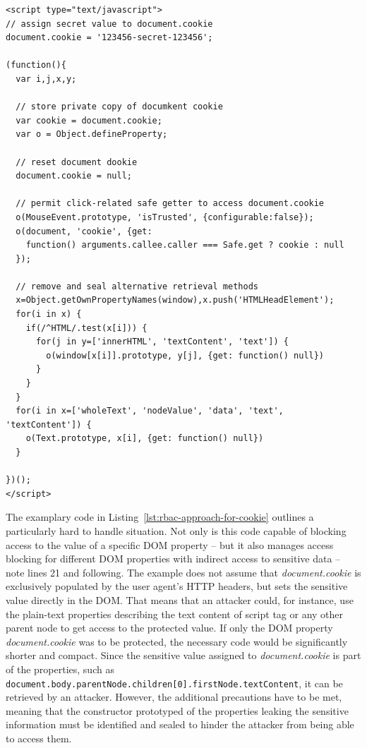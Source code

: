 \begin{lstlisting}[captionpos=b,label=lst:rbac-approach-for-cookie,caption=Proposed DOM-based RBAC approach to handle document.cookie access]
<script type="text/javascript">
// assign secret value to document.cookie
document.cookie = '123456-secret-123456';

(function(){
  var i,j,x,y; 

  // store private copy of documkent cookie
  var cookie = document.cookie; 
  var o = Object.defineProperty;
  
  // reset document dookie
  document.cookie = null;

  // permit click-related safe getter to access document.cookie
  o(MouseEvent.prototype, 'isTrusted', {configurable:false});
  o(document, 'cookie', {get: 
    function() arguments.callee.caller === Safe.get ? cookie : null
  });        

  // remove and seal alternative retrieval methods
  x=Object.getOwnPropertyNames(window),x.push('HTMLHeadElement');
  for(i in x) {
    if(/^HTML/.test(x[i])) {
      for(j in y=['innerHTML', 'textContent', 'text']) {
        o(window[x[i]].prototype, y[j], {get: function() null})
      }
    }
  }
  for(i in x=['wholeText', 'nodeValue', 'data', 'text', 'textContent']) {
    o(Text.prototype, x[i], {get: function() null})
  }

})();
</script>
\end{lstlisting}

      The examplary code in Listing~\ref{lst:rbac-approach-for-cookie} outlines a particularly hard to handle situation. Not only is this code capable of blocking access to the value of a specific DOM property -- but it also manages access blocking for different DOM properties with indirect access to sensitive data -- note lines 21 and following. The example does not assume that \textit{document.cookie} is exclusively populated by the user agent's HTTP headers, but sets the sensitive value directly in the DOM. That means that an attacker could, for instance, use the plain-text properties describing the text content of script tag or any other parent node to get access to the protected value. If only the DOM property \textit{document.cookie} was to be protected, the necessary code would be significantly shorter and compact. Since the sensitive value assigned to \textit{document.cookie} is part of the properties, such as  \texttt{document.body.parentNode.children[0].firstNode.textContent}, it can be retrieved by an attacker. However, the additional precautions have to be met, meaning that the constructor prototyped of the properties leaking the sensitive information must be identified and sealed to hinder the attacker from being able to access them. \\


